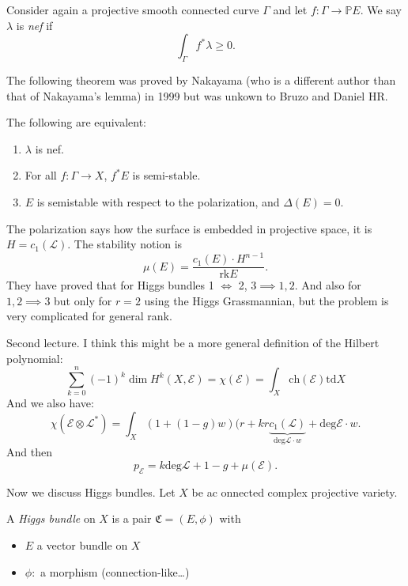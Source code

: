 \noindent
\begin{definition}
\label{definition-nef}
Consider again a projective smooth connected
curve $\Gamma$ and let $f:\Gamma \to
\mathbb{P}E$.
We say $\lambda$ is {\it nef} if
$$
\int_{\Gamma} f^*\lambda\geq 0.
$$
\end{definition}


\noindent
The following theorem was proved by Nakayama
(who is a different author than that of
Nakayama's lemma)
in 1999 but was unkown to Bruzo and Daniel
HR.
\begin{theorem}
\label{theorem-bruzzo-daniel-nakayama}
The following are equivalent:
\begin{enumerate}
\item $\lambda$ is nef.
\item For all $f:\Gamma \to X$,
$f^*E$ is semi-stable.
\item $E$ is semistable with respect to
the polarization, and  $\Delta(E)=0$.
\end{enumerate}
\end{theorem}

The polarization says how the surface is
embedded in projective space,
it is $H=c_1(\mathcal{L})$. The stability
notion is
$$
\mu(E)=\frac{c_1(E)\cdot
H^{n-1}}{\text{rk}E}.
$$
\medskip\noindent
They have proved that for Higgs bundles 1
$\iff$ 2, $3 \implies 1,2$.
And also for $1,2 \implies 3$ but only for
$r=2$ using the Higgs Grassmannian,
but the problem is very complicated for
general rank.

\medskip\noindent
Second lecture. I think this might be a more
general
definition of the Hilbert polynomial:
$$
\sum_{k=0}^n(-1)^k \dim
H^k(X,\mathcal{E})=\chi(\mathcal{E})
=\int_X\text{ch}(\mathcal{E})\text{td}X
$$
And we also have:
$$
\chi(\mathcal{E}\otimes \mathcal{L}^*)
=\int_X (1+(1-g)w)(r+kr
\underbrace{c_1(\mathcal{L})}_{\text{deg}
\mathcal{L}\cdot
w}
+\text{deg}\mathcal{E}\cdot w.
$$
And then
$$
p_{\mathcal{E}}=k \text{deg} \mathcal{L}
+1-g+\mu(\mathcal{E}).
$$



\medskip\noindent
Now we discuss Higgs bundles.
Let $X$ be ac onnected complex projective
variety.

\begin{definition}
\label{definition-higgs-bundle}
A {\it Higgs bundle} on $X$
is a pair $\mathfrak{C}=(E,\phi)$ with
\begin{itemize}
\item $E$ a vector bundle on $X$
\item $\phi:$ a morphism (connection-like…)
\end{itemize}
\end{definition}

